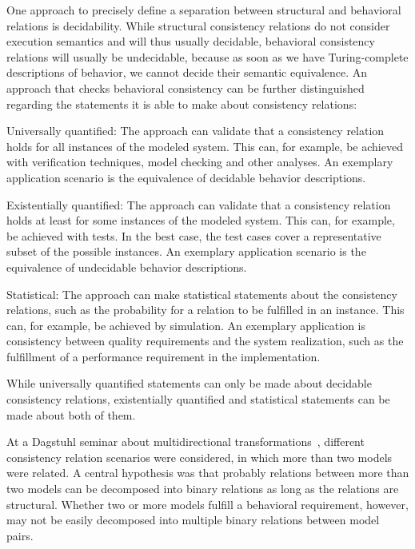 One approach to precisely define a separation between structural and behavioral relations is decidability.
While structural consistency relations do not consider execution semantics and will thus usually decidable, behavioral consistency relations will usually be undecidable, because as soon as we have Turing-complete descriptions of behavior, we cannot decide their semantic equivalence. %
An approach that checks behavioral consistency can be further distinguished regarding the statements it is able to make about consistency relations:
\begin{properdescription}
    \item[Universally quantified:] The approach can validate that a consistency relation holds for all instances of the modeled system. This can, for example, be achieved with verification techniques, model checking and other analyses. An exemplary application scenario is the equivalence of decidable behavior descriptions.
    \item[Existentially quantified:] The approach can validate that a consistency relation holds at least for some instances of the modeled system. This can, for example, be achieved with tests. In the best case, the test cases cover a representative subset of the possible instances. An exemplary application scenario is the equivalence of undecidable behavior descriptions.
    \item[Statistical:] The approach can make statistical statements about the consistency relations, such as the probability for a relation to be fulfilled in an instance. This can, for example, be achieved by simulation. An exemplary application is consistency between quality requirements and the system realization, such as the fulfillment of a performance requirement in the implementation.
\end{properdescription}
While universally quantified statements can only be made about decidable consistency relations, existentially quantified and statistical statements can be made about both of them.

At a Dagstuhl seminar about multidirectional transformations~\cite{cleve2019dagstuhl}, different consistency relation scenarios were considered, in which more than two models were related.
A central hypothesis was that probably relations between more than two models can be decomposed into binary relations as long as the relations are structural.
Whether two or more models fulfill a behavioral requirement, however, may not be easily decomposed into multiple binary relations between model pairs.

